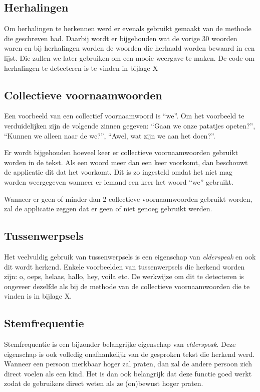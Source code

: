 \subsection{Herhalingen}
Om herhalingen te herkennen werd er evenals gebruikt gemaakt van de methode die \textcite{Standaert2021} geschreven had. Daarbij wordt er bijgehouden wat de vorige 30 woorden waren en bij herhalingen worden de woorden die herhaald worden bewaard in een lijst. Die zullen we later gebruiken om een mooie weergave te maken.
De code om herhalingen te detecteren is te vinden in bijlage X

\subsection{Collectieve voornaamwoorden}
Een voorbeeld van een collectief voornaamwoord is ``we''. Om het voorbeeld te verduidelijken zijn de volgende zinnen gegeven: ``Gaan we onze patatjes opeten?'', ``Kunnen we alleen naar de wc?'', ``Awel, wat zijn we aan het doen?''.

Er wordt bijgehouden hoeveel keer er collectieve voornaamwoorden gebruikt worden in de tekst. Als een woord meer dan een keer voorkomt, dan beschouwt de applicatie dit dat het voorkomt. Dit is zo ingesteld omdat het niet mag worden weergegeven wanneer er iemand een keer het woord ``we'' gebruikt.

Wanneer er geen of minder dan 2 collectieve voornaamwoorden gebruikt worden, zal de applicatie zeggen dat er geen of niet genoeg gebruikt werden.

\subsection{Tussenwerpsels}
Het veelvuldig gebruik van tussenwerpsels is een eigenschap van \textit{elderspeak} en ook dit wordt herkend. Enkele voorbeelden van tussenwerpsels die herkend worden zijn: o, oeps, helaas, hallo, hey, voila etc.
De werkwijze om dit te detecteren is ongeveer dezelfde als bij de methode van de collectieve voornaamwoorden die te vinden is in bijlage X.

\subsection{Stemfrequentie}
Stemfrequentie is een bijzonder belangrijke eigenschap van \textit{elderspeak}. Deze eigenschap is ook volledig onafhankelijk van de gesproken tekst die herkend werd. Wanneer een persoon merkbaar hoger zal praten, dan zal de andere persoon zich direct voelen als een kind. Het is dan ook belangrijk dat deze functie goed werkt zodat de gebruikers direct weten als ze (on)bewust hoger praten.


